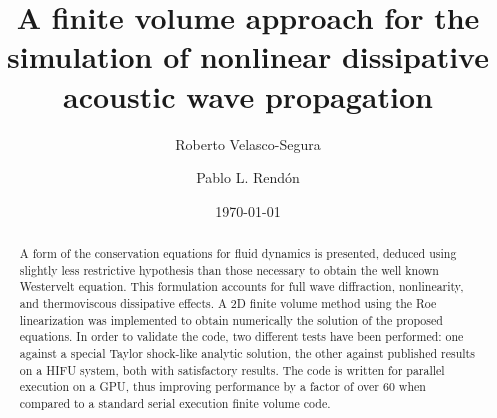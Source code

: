 



\title{A finite volume approach for the simulation of nonlinear dissipative acoustic wave propagation} 

\author{Roberto Velasco-Segura \\ 
\and Pablo L. Rend\'{o}n}

\date{\today}
\maketitle

%
%
%

\begin{abstract}
  A form of the conservation equations for fluid dynamics is presented, deduced using slightly less restrictive hypothesis than those necessary to obtain the well known Westervelt equation. 
  This formulation accounts for full wave diffraction, nonlinearity, and thermoviscous dissipative effects. 
  A 2D finite volume method using the Roe linearization was implemented to obtain numerically the solution of the proposed equations. 
  In order to validate the code, two different tests have been performed: 
  one against a special Taylor shock-like analytic solution, 
  the other against published results on a HIFU system, 
  both with satisfactory results. 
  The code is written for parallel execution on a GPU, thus improving performance by a factor of over 60 when compared to a standard serial execution finite volume code.
\end{abstract}

